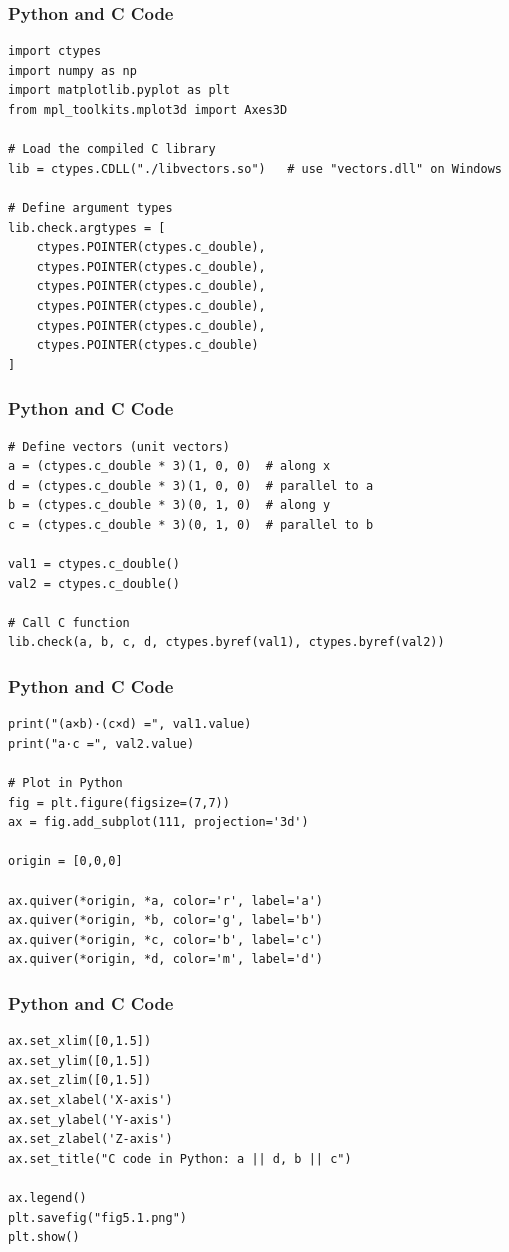 \documentclass{beamer}
\begin{document}
\begin{frame}[fragile]
\frametitle{Python and C Code}

\begin{lstlisting}
import ctypes
import numpy as np
import matplotlib.pyplot as plt
from mpl_toolkits.mplot3d import Axes3D

# Load the compiled C library
lib = ctypes.CDLL("./libvectors.so")   # use "vectors.dll" on Windows

# Define argument types
lib.check.argtypes = [
    ctypes.POINTER(ctypes.c_double), 
    ctypes.POINTER(ctypes.c_double),
    ctypes.POINTER(ctypes.c_double),
    ctypes.POINTER(ctypes.c_double),
    ctypes.POINTER(ctypes.c_double),
    ctypes.POINTER(ctypes.c_double)
]
\end{lstlisting}

\end{frame}
\begin{frame}[fragile]
\frametitle{Python and C Code}

\begin{lstlisting}
# Define vectors (unit vectors)
a = (ctypes.c_double * 3)(1, 0, 0)  # along x
d = (ctypes.c_double * 3)(1, 0, 0)  # parallel to a
b = (ctypes.c_double * 3)(0, 1, 0)  # along y
c = (ctypes.c_double * 3)(0, 1, 0)  # parallel to b

val1 = ctypes.c_double()
val2 = ctypes.c_double()

# Call C function
lib.check(a, b, c, d, ctypes.byref(val1), ctypes.byref(val2))
\end{lstlisting}

\end{frame}
\begin{frame}[fragile]
\frametitle{Python and C Code}

\begin{lstlisting}
print("(a×b)·(c×d) =", val1.value)
print("a·c =", val2.value)

# Plot in Python
fig = plt.figure(figsize=(7,7))
ax = fig.add_subplot(111, projection='3d')

origin = [0,0,0]

ax.quiver(*origin, *a, color='r', label='a')
ax.quiver(*origin, *b, color='g', label='b')
ax.quiver(*origin, *c, color='b', label='c')
ax.quiver(*origin, *d, color='m', label='d')
\end{lstlisting}

\end{frame}
\begin{frame}[fragile]
\frametitle{Python and C Code}

\begin{lstlisting}
ax.set_xlim([0,1.5])
ax.set_ylim([0,1.5])
ax.set_zlim([0,1.5])
ax.set_xlabel('X-axis')
ax.set_ylabel('Y-axis')
ax.set_zlabel('Z-axis')
ax.set_title("C code in Python: a || d, b || c")

ax.legend()
plt.savefig("fig5.1.png")
plt.show()
\end{lstlisting}

\end{frame}
\end{document}
